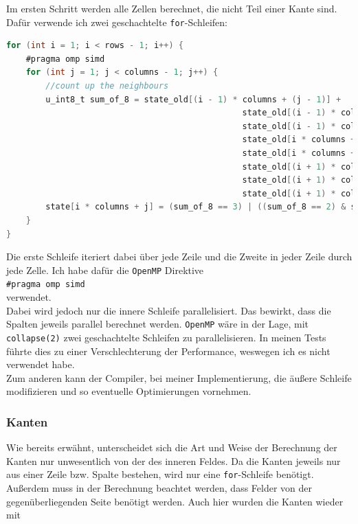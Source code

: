 \documentclass[german,plainarticle,hyperref,utf8]{zihpub}
\begin{document}
	Im ersten Schritt werden alle Zellen berechnet, die nicht Teil einer Kante sind. Dafür verwende ich zwei geschachtelte \texttt{for}-Schleifen:\\
	\begin{lstlisting}[language=C, caption=Berechnung der inneren Zellen]
for (int i = 1; i < rows - 1; i++) {
	#pragma omp simd
	for (int j = 1; j < columns - 1; j++) {
		//count up the neighbours
		u_int8_t sum_of_8 = state_old[(i - 1) * columns + (j - 1)] +
												state_old[(i - 1) * columns + j] +
												state_old[(i - 1) * columns + (j + 1)] +
												state_old[i * columns + (j - 1)] +
												state_old[i * columns + (j + 1)] +
												state_old[(i + 1) * columns + (j - 1)] +
												state_old[(i + 1) * columns + j] +
												state_old[(i + 1) * columns + (j + 1)];
		state[i * columns + j] = (sum_of_8 == 3) | ((sum_of_8 == 2) & state_old[i * columns + j]);
	}
}\end{lstlisting}
	
	Die erste Schleife iteriert dabei über jede Zeile und die Zweite in jeder Zeile durch jede Zelle. Ich habe dafür die \texttt{OpenMP} Direktive\\
	
	\texttt{\#pragma omp simd}\\
	
	verwendet.\\
	Dabei wird jedoch nur die innere Schleife parallelisiert. Das bewirkt, dass die Spalten jeweils parallel berechnet werden. \texttt{OpenMP} wäre in der Lage, mit \texttt{collapse(2)} zwei geschachtelte Schleifen zu parallelisieren. In meinen Tests führte dies zu einer Verschlechterung der Performance, weswegen ich es nicht verwendet habe.\\
	Zum anderen kann der Compiler, bei meiner Implementierung, die äußere Schleife modifizieren und so eventuelle Optimierungen vornehmen.
	\newpage
	\subsubsection{Kanten}
	
	Wie bereits erwähnt, unterscheidet sich die Art und Weise der Berechnung der Kanten nur unwesentlich von der des inneren Feldes. Da die Kanten jeweils nur aus einer Zeile bzw. Spalte bestehen, wird nur eine \texttt{for}-Schleife benötigt. Außerdem muss in der Berechnung beachtet werden, dass Felder von der gegenüberliegenden Seite benötigt werden.
	Auch hier wurden die Kanten wieder mit\\
	
\end{document}
